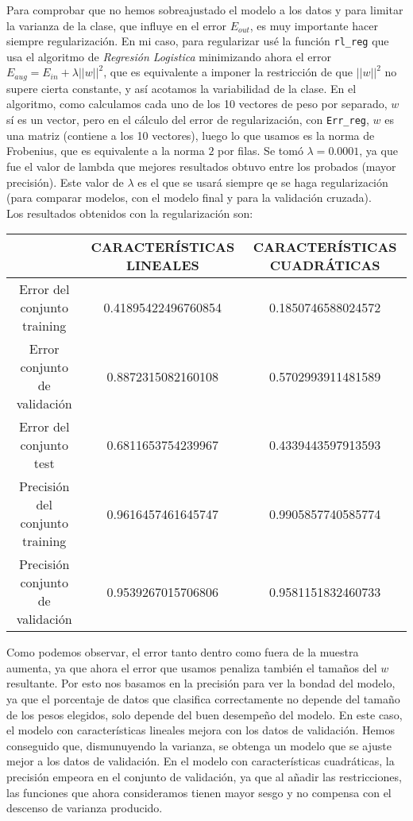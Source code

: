 \documentclass{article}
\begin{document}
Para comprobar que no hemos sobreajustado el modelo a los datos y para limitar la varianza de la clase, que influye en el error $E_{out}$, es muy importante hacer siempre regularización. En mi caso, para regularizar usé la función \texttt{rl\_reg} que usa el algoritmo de \textit{Regresión Logistica} minimizando ahora el error $E_{aug} = E_{in} + \lambda ||w||^2$, que es equivalente a imponer la restricción de que $||w||^2$ no supere cierta constante, y así acotamos la variabilidad de la clase. En el algoritmo, como calculamos cada uno de los 10 vectores de peso por separado, $w$ sí es un vector, pero en el cálculo del error de regularización, con \texttt{Err\_reg}, $w$ es una matriz (contiene a los 10 vectores), luego lo que usamos es la norma de Frobenius, que es equivalente a la norma $2$ por filas. Se tomó $\lambda = 0.0001$, ya que fue el valor de lambda que mejores resultados obtuvo entre los probados (mayor precisión). Este valor de $\lambda$ es el que se usará siempre qe se haga regularización (para comparar modelos, con el modelo final y para la validación cruzada).\\

Los resultados obtenidos con la regularización son:

\begin{center}
\begin{tabular}{|c|c|c|}
\hline
\multicolumn{1}{|c|}{}& \textbf{CARACTERÍSTICAS LINEALES} &
\textbf{CARACTERÍSTICAS CUADRÁTICAS}  \\ \hline
  Error del conjunto training       & 0.41895422496760854 & 0.1850746588024572 \\
  Error conjunto de validación      & 0.8872315082160108  & 0.5702993911481589 \\
  Error del conjunto test           & 0.6811653754239967  & 0.4339443597913593 \\
  Precisión del conjunto training   & 0.9616457461645747  & 0.9905857740585774 \\
  Precisión conjunto de validación  & 0.9539267015706806  & 0.9581151832460733 \\ \hline
\end{tabular}
\end{center}

Como podemos observar, el error tanto dentro como fuera de la muestra aumenta, ya que ahora el error que usamos penaliza también el tamaños del $w$ resultante. Por esto nos basamos en la precisión para ver la bondad del modelo, ya que el porcentaje de datos que clasifica correctamente no depende del tamaño de los pesos elegidos, solo depende del buen desempeño del modelo. En este caso, el modelo con características lineales mejora con los datos de validación. Hemos conseguido que, dismunuyendo la varianza, se obtenga un modelo que se ajuste mejor a los datos de validación. En el modelo con características cuadráticas, la precisión empeora en el conjunto de validación, ya que al añadir las restricciones, las funciones que ahora consideramos tienen mayor sesgo y no compensa con el descenso de varianza producido.\\
\end{document}
